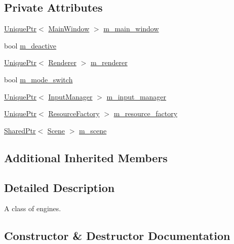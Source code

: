 \subsection*{Private Attributes}
\begin{DoxyCompactItemize}
\item 
\hyperlink{namespacemage_a8c307fbcc33bce9b7f2aa4c26c3b95cf}{Unique\+Ptr}$<$ \hyperlink{classmage_1_1_main_window}{Main\+Window} $>$ \hyperlink{classmage_1_1_engine_a3aea7e8c0c1247cac570334a3d3543d6}{m\+\_\+main\+\_\+window}
\item 
bool \hyperlink{classmage_1_1_engine_ab8a4b0157403708ae7d1d018a95b4c63}{m\+\_\+deactive}
\item 
\hyperlink{namespacemage_a8c307fbcc33bce9b7f2aa4c26c3b95cf}{Unique\+Ptr}$<$ \hyperlink{classmage_1_1_renderer}{Renderer} $>$ \hyperlink{classmage_1_1_engine_a1248b7c21bc8256c72d372c12ed1ee68}{m\+\_\+renderer}
\item 
bool \hyperlink{classmage_1_1_engine_aa5cb2e0b7bb2c4a9020e79ab832ee221}{m\+\_\+mode\+\_\+switch}
\item 
\hyperlink{namespacemage_a8c307fbcc33bce9b7f2aa4c26c3b95cf}{Unique\+Ptr}$<$ \hyperlink{classmage_1_1_input_manager}{Input\+Manager} $>$ \hyperlink{classmage_1_1_engine_a8e9048208a6a5c5b034aaa1cbdab28bc}{m\+\_\+input\+\_\+manager}
\item 
\hyperlink{namespacemage_a8c307fbcc33bce9b7f2aa4c26c3b95cf}{Unique\+Ptr}$<$ \hyperlink{classmage_1_1_resource_factory}{Resource\+Factory} $>$ \hyperlink{classmage_1_1_engine_a0c7c2d4fc75fc3512e02054056cf8a90}{m\+\_\+resource\+\_\+factory}
\item 
\hyperlink{namespacemage_a1e01ae66713838a7a67d30e44c67703e}{Shared\+Ptr}$<$ \hyperlink{classmage_1_1_scene}{Scene} $>$ \hyperlink{classmage_1_1_engine_a82158ab9c1b60538ef8c46d5eb263bb8}{m\+\_\+scene}
\end{DoxyCompactItemize}
\subsection*{Additional Inherited Members}


\subsection{Detailed Description}
A class of engines. 

\subsection{Constructor \& Destructor Documentation}
\hypertarget{classmage_1_1_engine_a99770cbb017b29c284d7f8e4c7e2b84c}{}\label{classmage_1_1_engine_a99770cbb017b29c284d7f8e4c7e2b84c} 
